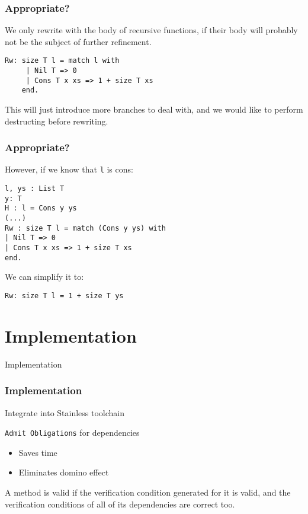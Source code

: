 \documentclass{beamer}
\newcommand{\coqInline}[1]{\lstinline[style=myCoqStyle]|#1|}
\begin{document}
\begin{frame}[fragile]
	\frametitle{Appropriate?}
	We only rewrite with the body of recursive functions, if their body will probably not be the subject of further refinement. 
	
	\begin{lstlisting}[style=myCoqstyle]
	Rw: size T l = match l with
	 | Nil T => 0
	 | Cons T x xs => 1 + size T xs
	end.
	\end{lstlisting}
	This will just introduce more branches to deal with, and we would like to perform destructing before rewriting. 
	
	
	
\end{frame}

\begin{frame}[fragile]
	\frametitle{Appropriate?}
	However, if we know that \coqInline{l} is cons:
\begin{lstlisting}[style=myCoqstyle]
l, ys : List T
y: T
H : l = Cons y ys
(...)
Rw : size T l = match (Cons y ys) with
| Nil T => 0
| Cons T x xs => 1 + size T xs
end.
\end{lstlisting}

	We can simplify it to: 
	
\begin{lstlisting}[style=myCoqstyle]
	Rw: size T l = 1 + size T ys
\end{lstlisting}
\end{frame}

\section{Implementation}

\begin{frame}
	\Huge{\centerline{Implementation}}
\end{frame}

\begin{frame}
	\frametitle{Implementation}
	
	Integrate into Stainless toolchain
	
	

	 {
		\coqInline{Admit Obligations} for dependencies
		
		\begin{itemize}
			\item Saves time
			\item Eliminates domino effect
		\end{itemize}
	
		A method is valid if the verification condition generated for it is valid, and the verification conditions of all of its dependencies are correct too.
	}
\end{frame}
\end{document}
